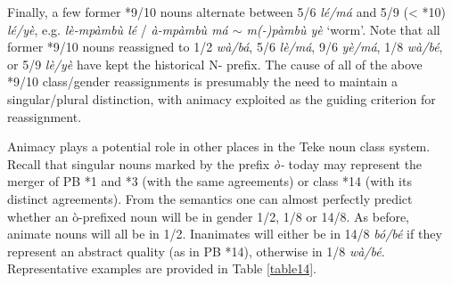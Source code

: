\documentclass[output=paper,,modfonts,nonflat]{langsci/langscibook-Hyman-et-al}
\begin{document}
Finally, a few former *9/10 nouns alternate between 5/6 \textit{lé/má} and 5/9 (< *10) \textit{lé/yè}, e.g. \textit{lè-mpàmbù lé} / \textit{à-mpàmbù má $\sim$ m(-)pàmbù yè} `worm’. Note that all former *9/10 nouns reassigned to 1/2 \textit{wà/bá}, 5/6 \textit{lè/má}, 9/6 \textit{yè/má}, 1/8 \textit{wà/bé}, or 5/9 \textit{lè/yè} have kept the historical N- prefix. The cause of all of the above *9/10 class/gender reassignments is presumably the need to maintain a singular/plural distinction, with animacy exploited as the guiding criterion for reassignment.

Animacy plays a potential role in other places in the Teke noun class system. Recall that singular nouns marked by the prefix \textit{ò-} today may represent the merger of PB *1 and *3 (with the same agreements) or class *14 (with its distinct agreements). From the semantics one can almost perfectly predict whether an ò-prefixed noun will be in gender 1/2, 1/8 or 14/8. As before, animate nouns will all be in 1/2. Inanimates will either be in 14/8 \textit{bó/bé} if they represent an abstract quality (as in PB *14), otherwise in 1/8 \textit{wà/bé}. Representative examples are provided in Table \ref{table14}.

\end{document}
